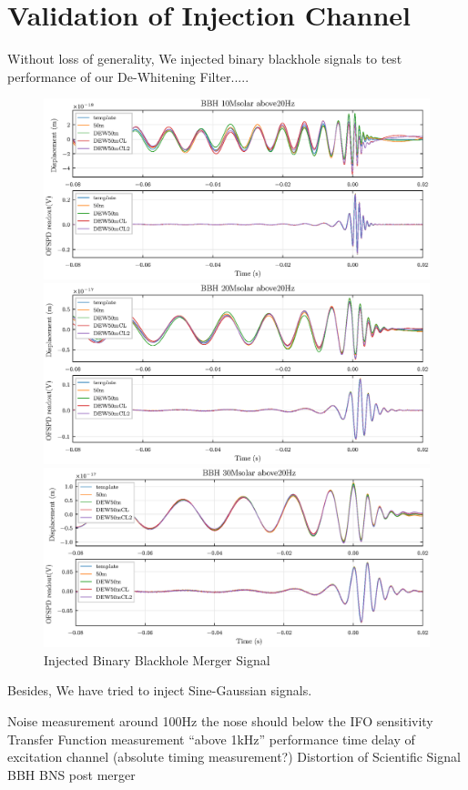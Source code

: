 




\chapter{Validation of Injection Channel}

Without loss of generality, We injected binary blackhole   signals to test performance of our De-Whitening Filter.....

  

\begin{figure}[hbt!]
\centering
\includegraphics[width=\textwidth]{figure/inj/10.eps}


\includegraphics[width=\textwidth]{figure/inj/20.eps}


\includegraphics[width=\textwidth]{figure/inj/30.eps}
\caption{Injected Binary Blackhole Merger Signal}\label{fig:bbhinj}
\end{figure}


Besides, We have tried to inject Sine-Gaussian signals.




Noise measurement
around 100Hz  the nose should below the IFO sensitivity
Transfer Function measurement
“above 1kHz” performance
time delay of excitation channel
(absolute timing measurement?)
Distortion of Scientific Signal
BBH
BNS post merger



